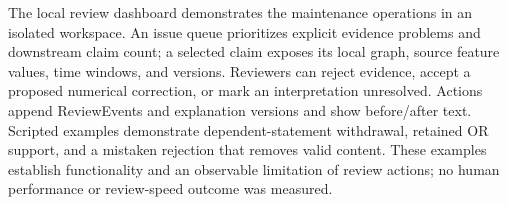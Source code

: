 The local review dashboard demonstrates the maintenance operations in an isolated
workspace. An issue queue prioritizes explicit evidence problems and downstream
claim count; a selected claim exposes its local graph, source feature values,
time windows, and versions. Reviewers can reject evidence, accept a proposed
numerical correction, or mark an interpretation unresolved. Actions append
ReviewEvents and explanation versions and show before/after text. Scripted
examples demonstrate dependent-statement withdrawal, retained OR support, and
a mistaken rejection that removes valid content. These examples establish
functionality and an observable limitation of review actions; no human performance
or review-speed outcome was measured.
